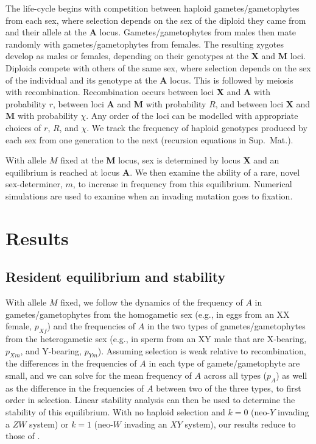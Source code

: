 \documentclass[12pt]{article}
\begin{document}
The life-cycle begins with competition between haploid gametes/gametophytes from each sex, where selection depends on the sex of the diploid they came from and their allele at the \textbf{A} locus.
Gametes/gametophytes from males then mate randomly with gametes/gametophytes from females.
The resulting zygotes develop as males or females, depending on their genotypes at the \textbf{X} and \textbf{M} loci.
Diploids compete with others of the same sex, where selection depends on the sex of the individual and its genotype at the \textbf{A} locus.
This is followed by meiosis with recombination. 
Recombination occurs between loci \textbf{X} and \textbf{A} with probability $r$, between loci \textbf{A} and \textbf{M} with probability $R$, and between loci \textbf{X} and \textbf{M} with probability $\chi$. %
Any order of the loci can be modelled with appropriate choices of $r$, $R$, and $\chi$.
We track the frequency of haploid genotypes produced by each sex from one generation to the next (recursion equations in Sup.\ Mat.).

With allele $M$ fixed at the \textbf{M} locus, sex is determined by locus \textbf{X} and an equilibrium is reached at locus \textbf{A}. %
We then examine the ability of a rare, novel sex-determiner, $m$, to increase in frequency from this equilibrium.
Numerical simulations are used to examine when an invading mutation goes to fixation.

\section*{Results}

\subsection*{Resident equilibrium and stability}
With allele $M$ fixed, we follow the dynamics of the frequency of $A$ in gametes/gametophytes from the homogametic sex (e.g., in eggs from an XX female, $p_{Xf}$) and the frequencies of $A$ in the two types of gametes/gametophytes from the heterogametic sex (e.g., in sperm from an XY male that are X-bearing, $p_{Xm}$, and Y-bearing, $p_{Ym}$).
Assuming selection is weak relative to recombination, the differences in the frequencies of $A$ in each type of gamete/gametophyte are small, and we can solve for the mean frequency of $A$ across all types ($p_A$) as well as the difference in the frequencies of $A$ between two of the three types, to first order in selection.
Linear stability analysis can then be used to determine the stability of this equilibrium.
With no haploid selection and $k=0$ (neo-$Y$ invading a $ZW$ system) or $k=1$ (neo-$W$ invading an $XY$ system), our results reduce to those of \cite{vanDoorn:2010hu}.
\end{document}
